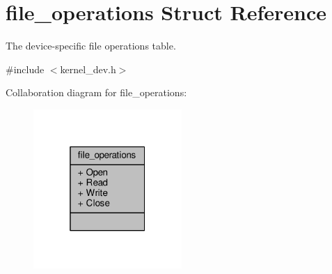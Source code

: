 \hypertarget{structfile__operations}{}\section{file\+\_\+operations Struct Reference}
\label{structfile__operations}


The device-\/specific file operations table.  




{\ttfamily \#include $<$kernel\+\_\+dev.\+h$>$}



Collaboration diagram for file\+\_\+operations\+:\nopagebreak
\begin{figure}[H]
\begin{center}
\leavevmode
\includegraphics[width=160pt]{structfile__operations__coll__graph}
\end{center}
\end{figure}
